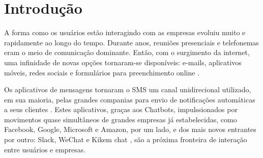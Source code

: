 \documentclass[quali]{mpit}
\begin{document}
 

\capa



\section{Introdução}

A forma como os usuários estão interagindo com as empresas evoluiu muito e rapidamente ao longo do tempo.
Durante anos, reuniões presenciais e telefonemas eram o meio de comunicação dominante. Então, com o surgimento da internet, uma infinidade de novas opções tornaram-se disponíveis: e-mails, aplicativos móveis, redes sociais e formulários para preenchimento online \cite{SalesforceDriftAudience2018TheReport}. 

Os aplicativos de mensagens tornaram o SMS um canal unidirecional utilizado, em sua maioria, pelas grandes companias para envio de notificações automáticas a seus clientes \cite{MobileTime2018MensageriaBrasil}
. Estes aplicativos, graças aos Chatbots, impulssionados por movimentos quase simultâneos de grandes empresas já estabelecidas, como Facebook, Google, Microsoft e Amazon, por um lado, e dos mais novos entrantes por outro: Slack, WeChat e Kikem chat \cite{MindBowser2017ChatbotSurvey}, são a próxima fronteira de interação entre usuários e empresas.

\end{document}
